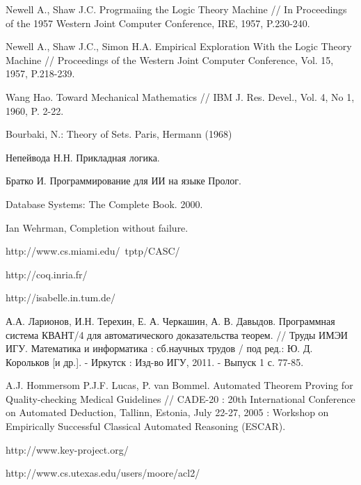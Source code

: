 \begin{thebibliography}{99}
 Newell A., Shaw J.C. Progrmaiing the Logic Theory Machine // In Proceedings of the 1957 Western Joint Computer Conference, IRE, 1957, P.230-240.

 Newell A., Shaw J.C., Simon H.A. Empirical Exploration With the Logic Theory Machine // Proceedings of the Western Joint Computer Conference, Vol. 15, 1957, P.218-239.

 Wang Hao. Toward Mechanical Mathematics // IBM J. Res. Devel., Vol. 4, No 1, 1960, P. 2-22. 

 Bourbaki, N.: Theory of Sets. Paris, Hermann (1968)

 Непейвода Н.Н. Прикладная логика.

 Братко И. Программирование для ИИ на языке Пролог.

 Database Systems: The Complete Book. 2000.

 Ian Wehrman, Completion without failure.

 http://www.cs.miami.edu/~tptp/CASC/

 http://coq.inria.fr/

 http://isabelle.in.tum.de/

 А.А. Ларионов, И.Н. Терехин, Е. А. Черкашин, А. В. Давыдов.
Программная система КВАНТ/4 для автоматического доказательства теорем.
// Труды ИМЭИ ИГУ. Математика и информатика : сб.научных трудов / под
ред.: Ю. Д. Корольков [и др.]. - Иркутск : Изд-во ИГУ, 2011. - Выпуск
1 с. 77-85.

 A.J. Hommersom P.J.F. Lucas, P. van Bommel. Automated Theorem Proving for Quality-checking Medical Guidelines // CADE-20 : 20th International Conference on Automated Deduction, Tallinn, Estonia, July 22-27, 2005 : Workshop on Empirically Successful Classical Automated Reasoning (ESCAR).

 http://www.key-project.org/

 http://www.cs.utexas.edu/users/moore/acl2/

\end{thebibliography}



